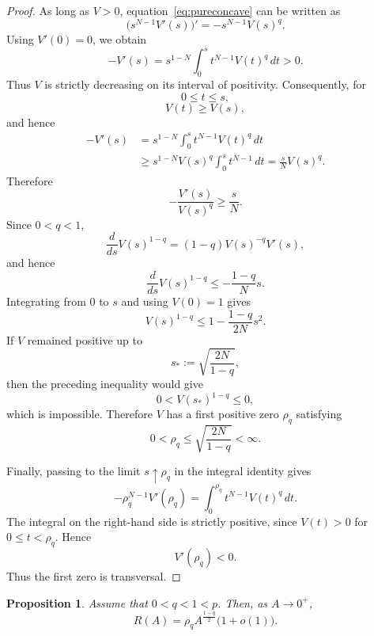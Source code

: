 \documentclass[11pt]{article}
\newcommand{\oldrev}[1]{#1}
\newtheorem{proposition}[theorem]{Proposition}
\theoremstyle{definition}
\begin{document}
\begin{proof}
As long as $V>0$, \oldrev{equation~\eqref{eq:pureconcave}
can be written as}
\[
\oldrev{\bigl(s^{N-1}V'(s)\bigr)'
=
-s^{N-1}V(s)^q.}
\]
\oldrev{Using $V'(0)=0$, we obtain}
\[
-V'(s)
=
s^{1-N}
\int_0^s t^{N-1}V(t)^q\,dt>0.
\]
Thus $V$ is strictly decreasing on its interval of positivity.
Consequently, for
\[
\oldrev{0\leq t\leq s},
\]
\[
V(t)\geq V(s),
\]
and hence
\[
\begin{aligned}
-V'(s)
&=
\oldrev{s^{1-N}
\int_0^s t^{N-1}V(t)^q\,dt}\\
&\geq
s^{1-N}V(s)^q
\int_0^s t^{N-1}\,dt
=
\frac{s}{N}V(s)^q.
\end{aligned}
\]
Therefore
\[
-\frac{V'(s)}{V(s)^q}
\geq
\frac{s}{N}.
\]
\oldrev{Since $0<q<1$,
\[
\frac{d}{ds}V(s)^{1-q}
=
(1-q)V(s)^{-q}V'(s),
\]
and hence
\[
\frac{d}{ds}V(s)^{1-q}
\leq
-\frac{1-q}{N}s.
\]}
Integrating from $0$ to $s$ \oldrev{and using $V(0)=1$} gives
\[
V(s)^{1-q}
\leq
1-\frac{1-q}{2N}s^2.
\]
\oldrev{If $V$ remained positive up to
\[
s_*:=\sqrt{\frac{2N}{1-q}},
\]
then the preceding inequality would give
\[
0<V(s_*)^{1-q}\leq0,
\]
which is impossible. Therefore $V$ has a first positive zero
$\rho_q$ satisfying
\[
0<\rho_q\leq
\sqrt{\frac{2N}{1-q}}<\infty.
\]}

Finally, \oldrev{passing to the limit $s\uparrow\rho_q$ in the
integral identity} gives
\[
-\rho_q^{N-1}V'(\rho_q)
=
\int_0^{\rho_q}
t^{N-1}V(t)^q\,dt.
\]
\oldrev{The integral on the right-hand side is strictly
positive, since $V(t)>0$ for $0\leq t<\rho_q$.} Hence
\[
V'(\rho_q)<0.
\]
\oldrev{Thus the first zero is transversal.}
\end{proof}


\begin{proposition}
\label{prop:smallasymptotic}
\oldrev{Assume that $0<q<1<p$. Then,} as $A\to0^+$,
\begin{equation}
\label{eq:Rsmall}
R(A)
=
\rho_q
A^{\frac{1-q}{2}}
\bigl(1+o(1)\bigr).
\end{equation}
\end{proposition}
\end{document}
